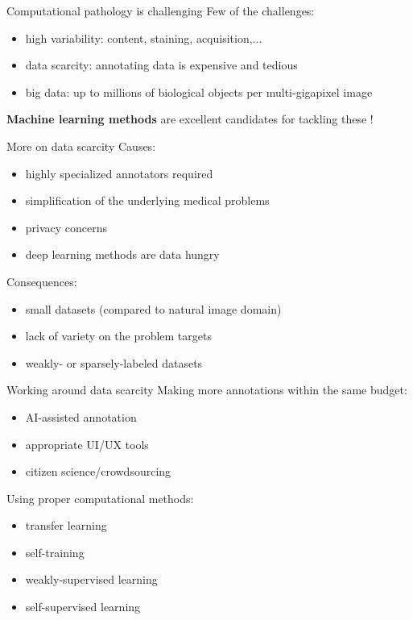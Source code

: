 \documentclass{beamer}
\begin{document}
\begin{frame}{Computational pathology is challenging}
	Few of the challenges:
	\begin{itemize}
		\item {high variability}: content, staining, acquisition,...
		\item {data scarcity}: annotating data is expensive and tedious
		\item {big data}: up to millions of biological objects per multi-gigapixel image
	\end{itemize}
	\vfill
	\begin{center}
		\large
		\textbf{Machine learning methods} are excellent candidates for tackling these !
	\end{center}
\end{frame}

\begin{frame}{More on data scarcity}
Causes:
\begin{itemize}
	\item highly specialized annotators required
	\item simplification of the underlying medical problems
	\item privacy concerns
	\item deep learning methods are data hungry 
\end{itemize}

Consequences:
\begin{itemize}
	\item small datasets (compared to natural image domain)
	\item lack of variety on the problem targets 
	\item weakly- or sparsely-labeled datasets 
\end{itemize}
\end{frame}

\begin{frame}{Working around data scarcity}
Making more annotations within the same budget:
\begin{itemize}
	\item AI-assisted annotation
	\item appropriate UI/UX tools 
	\item citizen science/crowdsourcing
\end{itemize}

Using proper computational methods:
\begin{itemize}
	\item transfer learning
	\item self-training
	\item weakly-supervised learning
	\item self-supervised learning
\end{itemize}
\end{frame}
\end{document}

